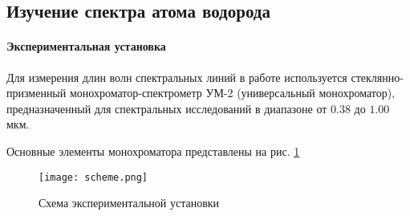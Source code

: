 \subsection{Изучение спектра атома водорода}

\paragraph{Экспериментальная установка}
Для измерения длин волн спектральных линий в работе используется
стеклянно-призменный монохроматор-спектрометр УМ-2 (универсальный монохроматор),
предназначенный для спектральных исследований в диапазоне от $0.38$ до $1.00$
мкм.


Основные элементы монохроматора представлены на рис. \ref{img::scheme}
\begin{figure}[h!]
  \centering
  \texttt{[image: scheme.png]}
  \caption{Схема экспериментальной установки}
  \label{img::scheme}
\end{figure}


